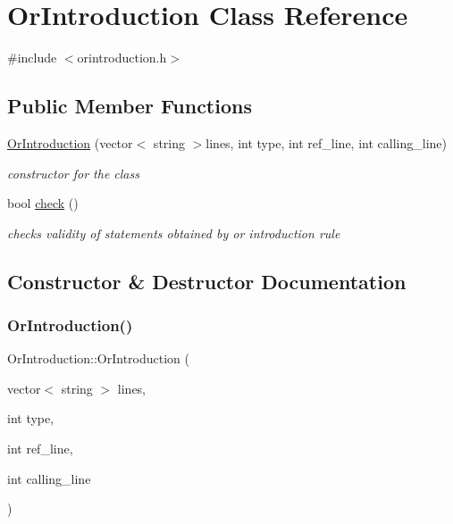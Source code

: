 \hypertarget{class_or_introduction}{}\section{Or\+Introduction Class Reference}
\label{class_or_introduction}


{\ttfamily \#include $<$orintroduction.\+h$>$}

\subsection*{Public Member Functions}
\begin{DoxyCompactItemize}
\item 
\mbox{\hyperlink{class_or_introduction_a67b90e4ccc3ff7e5a1785ce85cbab456}{Or\+Introduction}} (vector$<$ string $>$lines, int type, int ref\+\_\+line, int calling\+\_\+line)
\begin{DoxyCompactList}\small\item\em constructor for the class \end{DoxyCompactList}\item 
bool \mbox{\hyperlink{class_or_introduction_ab423ec56ad49734ee6165ebbc66463f2}{check}} ()
\begin{DoxyCompactList}\small\item\em checks validity of statements obtained by or introduction rule \end{DoxyCompactList}\end{DoxyCompactItemize}


\subsection{Constructor \& Destructor Documentation}
\mbox{\label{class_or_introduction_a67b90e4ccc3ff7e5a1785ce85cbab456}} 
\subsubsection{\texorpdfstring{Or\+Introduction()}{OrIntroduction()}}
{\footnotesize\ttfamily Or\+Introduction\+::\+Or\+Introduction (\begin{DoxyParamCaption}\item[{vector$<$ string $>$}]{lines,  }\item[{int}]{type,  }\item[{int}]{ref\+\_\+line,  }\item[{int}]{calling\+\_\+line }\end{DoxyParamCaption})\hspace{0.3cm}{\ttfamily [inline]}}



